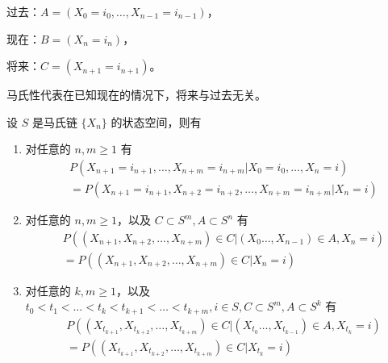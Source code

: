 \documentclass[lang=cn,10pt,thmcnt=section]{elegantbook}
\begin{document}
过去：$A = (X_0 = i_0, \ldots, X_{n-1} = i_{n-1})$，

现在：$B = (X_n = i_n)$，

将来：$C = (X_{n+1} = i_{n+1})$。

马氏性代表在已知现在的情况下，将来与过去无关。
\begin{theorem}
	设 $S$ 是马氏链 $\{X_n\}$ 的状态空间，则有
\begin{enumerate}
    \item 对任意的 $n, m \geq 1$ 有
    \[
    \begin{aligned}
    & P(X_{n+1} = i_{n+1}, \ldots, X_{n+m} = i_{n+m} | X_0 = i_0, \ldots, X_n = i) \\
    & = P(X_{n+1} = i_{n+1}, X_{n+2} = i_{n+2}, \ldots, X_{n+m} = i_{n+m} | X_n = i)
    \end{aligned}
    \]
    \item 对任意的 $n, m \geq 1$，以及 $C \subset S^m, A \subset S^n$ 有
    \[
    \begin{aligned}
    & P((X_{n+1}, X_{n+2}, \ldots, X_{n+m}) \in C | (X_0 \ldots, X_{n-1}) \in A, X_n = i) \\
    & = P((X_{n+1}, X_{n+2}, \ldots, X_{n+m}) \in C | X_n = i)
    \end{aligned}
    \]
    \item 对任意的 $k, m \geq 1$，以及 $t_0 < t_1 < \ldots < t_k < t_{k+1} < \ldots < t_{k+m}, i \in S, C \subset S^m, A \subset S^k$ 有
    \[
    \begin{aligned}
    & P((X_{t_{k+1}}, X_{t_{k+2}}, \ldots, X_{t_{k+m}}) \in C | (X_{t_0} \ldots, X_{t_{k-1}}) \in A, X_{t_k} = i) \\
    & = P((X_{t_{k+1}}, X_{t_{k+2}}, \ldots, X_{t_{k+m}}) \in C | X_{t_k} = i)
    \end{aligned}
    \]
\end{enumerate}
\end{theorem}
\end{document}
